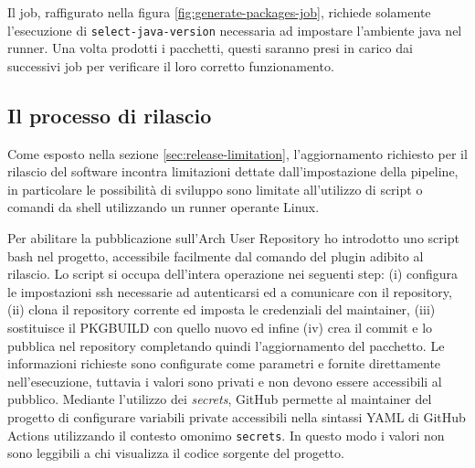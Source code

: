 Il job, raffigurato nella figura \ref{fig:generate-packages-job}, richiede solamente l'esecuzione di \texttt{select\--java\--version} necessaria ad impostare l'ambiente java nel runner. Una volta prodotti i pacchetti, questi saranno presi in carico dai successivi job per verificare il loro corretto funzionamento.

\subsection{Il processo di rilascio}

Come esposto nella sezione \ref{sec:release-limitation}, l'aggiornamento richiesto per il rilascio del software incontra limitazioni dettate dall'impostazione della pipeline, in particolare le possibilità di sviluppo sono limitate all'utilizzo di script o comandi da shell utilizzando un runner operante Linux.

Per abilitare la pubblicazione sull'Arch User Repository ho introdotto uno script bash nel progetto, accessibile facilmente dal comando del plugin adibito al rilascio. Lo script si occupa dell'intera operazione nei seguenti step: (i) configura le impostazioni ssh necessarie ad autenticarsi ed a comunicare con il repository, (ii) clona il repository corrente ed imposta le credenziali del maintainer, (iii) sostituisce il PKGBUILD con quello nuovo ed infine (iv) crea il commit e lo pubblica nel repository completando quindi l'aggiornamento del pacchetto. Le informazioni richieste sono configurate come parametri e fornite direttamente nell'esecuzione, tuttavia i valori sono privati e non devono essere accessibili al pubblico. Mediante l'utilizzo dei \textit{secrets}, GitHub permette al maintainer del progetto di configurare variabili private accessibili nella sintassi YAML di GitHub Actions utilizzando il contesto omonimo \texttt{secrets}. In questo modo i valori non sono leggibili a chi visualizza il codice sorgente del progetto.

